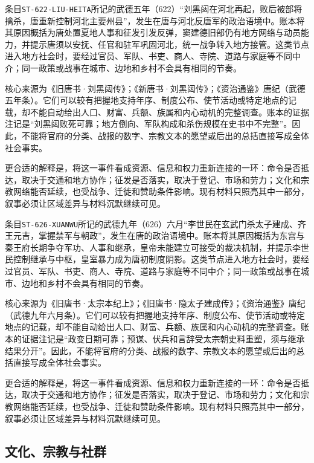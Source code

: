 
条目\texttt{ST-622-LIU-HEITA}所记的武德五年（622）“刘黑闼在河北再起，败后被部将擒杀，唐重新控制河北主要州县”，发生在唐与河北反唐军的政治语境中。账本将其原因概括为唐处置夏地人事和征发引发反弹，窦建德旧部仍有地方网络与动员能力，并提示唐须以安抚、任官和驻军巩固河北，统一战争转入地方接管。这类节点进入地方社会时，要经过官员、军队、书吏、商人、寺院、道路与家庭等不同中介；同一政策或战事在城市、边地和乡村不会具有相同的节奏。

核心来源为《旧唐书·刘黑闼传》；《新唐书·刘黑闼传》；《资治通鉴》唐纪（武德五年条）。它们可以较有把握地支持年序、制度公布、使节活动或特定地点的记载，却不能自动给出人口、财富、兵额、族属和内心动机的完整调查。账本的证据注记是“刘黑闼败死可靠；地方倒向、军队构成和杀伤规模在史书中不完整”。因此，不能将官府的分类、战报的数字、宗教文本的愿望或后出的总括直接写成全体社会事实。

更合适的解释是，将这一事件看成资源、信息和权力重新连接的一环：命令是否抵达，取决于交通和地方协作；征发是否落实，取决于登记、市场和劳力；文化和宗教网络能否延续，也受战争、迁徙和赞助条件影响。现有材料只照亮其中一部分，叙事必须让区域差异与材料沉默继续可见。


条目\texttt{ST-626-XUANWU}所记的武德九年（626）六月“李世民在玄武门杀太子建成、齐王元吉，掌握禁军与朝政”，发生在唐的政治语境中。账本将其原因概括为东宫与秦王府长期争夺军功、人事和继承，皇帝未能建立可接受的裁决机制，并提示李世民控制继承与中枢，皇室暴力成为唐初制度阴影。这类节点进入地方社会时，要经过官员、军队、书吏、商人、寺院、道路与家庭等不同中介；同一政策或战事在城市、边地和乡村不会具有相同的节奏。

核心来源为《旧唐书·太宗本纪上》；《旧唐书·隐太子建成传》；《资治通鉴》唐纪（武德九年六月条）。它们可以较有把握地支持年序、制度公布、使节活动或特定地点的记载，却不能自动给出人口、财富、兵额、族属和内心动机的完整调查。账本的证据注记是“政变日期可靠；预谋、伏兵和言辞受太宗朝史料重塑，须与继承结果分开”。因此，不能将官府的分类、战报的数字、宗教文本的愿望或后出的总括直接写成全体社会事实。

更合适的解释是，将这一事件看成资源、信息和权力重新连接的一环：命令是否抵达，取决于交通和地方协作；征发是否落实，取决于登记、市场和劳力；文化和宗教网络能否延续，也受战争、迁徙和赞助条件影响。现有材料只照亮其中一部分，叙事必须让区域差异与材料沉默继续可见。

\subsection{文化、宗教与社群}

